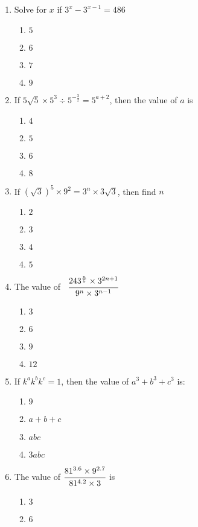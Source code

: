 \begin{multicols}{2}
\begin{enumerate}[label={\arabic*.}]
\item Solve for $x$ if $3^x - 3^{x-1} = 486$
	\begin{enumerate}[label={\Alph*.}]
	\item \(5\)
	\item \(6\)
	\item \(7\)
	\item \(9\)
	\end{enumerate}
\item If $5\sqrt{5} \times 5^3 \div 5^{-\frac{3}{2}} = 5^{a+2}$, then the value of $a$ is 
	\begin{enumerate}[label={\Alph*.}]
	\item \(4\)
	\item \(5\)
	\item \(6\)
	\item \(8\)
	\end{enumerate}
\item If $\left(\sqrt{3}\right)^5 \times 9^2 = 3^n \times 3\sqrt{3}$, then find $n$
	\begin{enumerate}[label={\Alph*.}]
	\item \(2\)
	\item \(3\)
	\item \(4\)
	\item \(5\)
	\end{enumerate}
\item The value of \, $\cfrac{243^{\frac{n}{5}} \times 3^{2n + 1}}{9^n \times 3^{n-1}}$
	\begin{enumerate}[label={\Alph*.}]
	\item \(3\)
	\item \(6\)
	\item \(9\)
	\item \(12\)
	\end{enumerate}
\item If $k^ak^bk^c = 1$, then the value of $a^3 + b^3 + c^3$ is:
	\begin{enumerate}[label={\Alph*.}]
	\item \(9\)
	\item \(a + b + c\)
	\item \(abc\)
	\item \(3abc\)
	\end{enumerate}
\item The value of $\cfrac{81^{3.6} \times 9^{2.7}}{81^{4.2} \times 3}$ is
	\begin{enumerate}[label={\Alph*.}]
	\item \(3\)
	\item \(6\)

\end{enumerate}
\end{enumerate}
\end{multicols}
